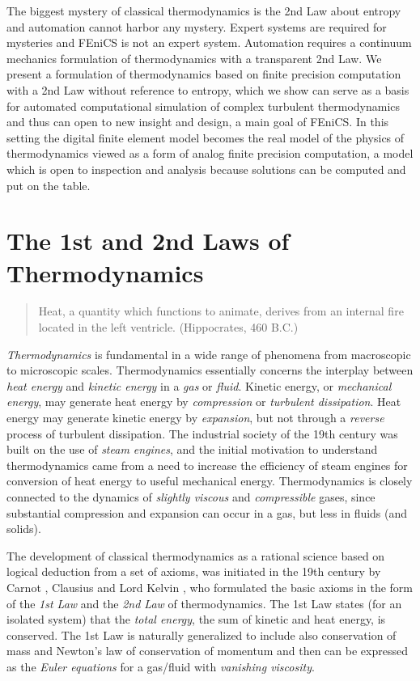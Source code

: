The biggest mystery of classical thermodynamics is the 2nd Law about entropy and
automation cannot harbor any mystery. 
Expert systems are required for mysteries and FEniCS is not an expert system.
Automation requires a continuum mechanics formulation of thermodynamics with a
transparent 2nd Law.
We present a formulation of thermodynamics based on finite precision computation
with a 2nd Law without
reference to entropy, which we show can serve as a basis for automated
computational simulation of complex turbulent thermodynamics
and thus can open to new insight and design, a main goal of FEniCS. In this
setting the digital finite element model becomes the 
real model of the physics of thermodynamics viewed as a form of analog finite
precision computation, a model which is open to 
inspection and analysis because solutions can be computed and put on the table.

\section{The 1st and 2nd Laws of Thermodynamics}

\small
\begin{quote} Heat, a quantity which functions to animate, derives
from an internal fire located in the left ventricle. (Hippocrates, 460 B.C.)
\end{quote}
\small
\normalsize

\emph{Thermodynamics} is fundamental in a wide range of phenomena from
macroscopic to microscopic scales. 
Thermodynamics essentially concerns the interplay between \emph{heat energy} 
and \emph{kinetic energy} in a \emph{gas} or \emph{fluid}. 
Kinetic energy, or \emph{mechanical energy}, 
may generate heat energy by 
\emph{compression}
or \emph{turbulent dissipation}. 
Heat energy may generate kinetic energy by \emph{expansion}, but
not through a \emph{reverse} process of turbulent dissipation. 
The industrial society
of the 19th century was built on the use of \emph{steam engines}, and the 
initial motivation to understand thermodynamics came from a need to
increase the efficiency of steam engines for conversion of heat energy to
useful mechanical energy. 
Thermodynamics is closely connected to the dynamics of \emph{slightly viscous}
and \emph{compressible} gases, since substantial compression and 
expansion can occur in a gas, but less in fluids (and solids).

The development of classical thermodynamics as a rational science 
based on logical deduction from a set of axioms, was initiated in 
the 19th century by Carnot \cite{carnot}, Clausius 
\cite{claus1984} and Lord Kelvin \cite{kelvin}, who formulated
the basic axioms in the form of the \emph{1st Law} and the \emph{2nd Law} of
thermodynamics. The 1st Law states (for an isolated system)
that the \emph{total energy},
the sum of kinetic and heat energy, is conserved.
The 1st Law is naturally generalized to include also conservation 
of mass and Newton's law of conservation of momentum and then 
can be expressed as the \emph{Euler equations} for  a gas/fluid 
with \emph{vanishing viscosity}.

